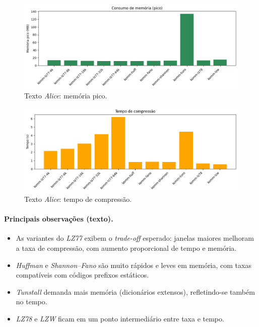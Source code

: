 \begin{figure}[h]
  \centering
  \caption{Texto \textit{Alice}: memória pico.}
  \label{fig:komm-alice-memory}
  \includegraphics[width=15cm]{figuras/komm_alice_memory.png}
\end{figure}

\begin{figure}[h]
  \centering
  \caption{Texto \textit{Alice}: tempo de compressão.}
  \label{fig:komm-alice-time}
  \includegraphics[width=15cm]{figuras/komm_alice_time.png}
\end{figure}

\paragraph{Principais observações (texto).}
\begin{itemize}
  \item As variantes do \textit{LZ77} exibem o \emph{trade-off} esperado: janelas maiores melhoram a taxa de compressão, com aumento proporcional de tempo e memória.
  \item \textit{Huffman} e \textit{Shannon--Fano} são muito rápidos e leves em memória, com taxas compatíveis com códigos prefixos estáticos.
  \item \textit{Tunstall} demanda mais memória (dicionários extensos), refletindo-se também no tempo.
  \item \textit{LZ78} e \textit{LZW} ficam em um ponto intermediário entre taxa e tempo.
\end{itemize}

